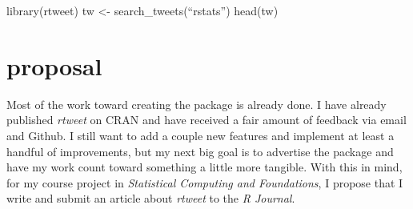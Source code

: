 \begin{example}
  library(rtweet)
  tw <- search_tweets(``rstats'')
  head(tw)
\end{example}

\section{proposal}

Most of the work toward creating the package is already done. I have
already published \textit{rtweet} on CRAN and have received a fair amount
of feedback via email and Github. I still want to add a couple new
features and implement at least a handful of improvements, but my
next big goal is to advertise the package and have my work count toward
something a little more tangible. With this in mind, for my course project
in \textit{Statistical Computing and Foundations}, I propose that I write and
submit an article about \textit{rtweet} to the \textit{R Journal}.



\address{Michael W. Kearney\\
  University of Kansas\\
  1440 Jayhawk Blvd, Bailey Rm. 102\\
  Lawrence, KS 66044\\}
